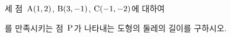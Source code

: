 세 점~$\mathrm{A}(1{,}\mkern3mu\mathopen{}2)$, $\mathrm{B}(3{,}\mkern3mu\mathopen{}-1)$, $\mathrm{C}(-1{,}\mkern3mu\mathopen{}-2)$에 대하여 \par\smallskip{}\par\smallskip\noindent 를 만족시키는 점~$\mathrm{P}$가 나타내는 도형의 둘레의 길이를 구하시오.
